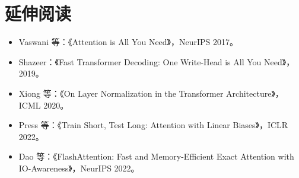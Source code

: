\documentclass[UTF8,zihao=-4]{ctexart}
\begin{document}
\section*{延伸阅读}
\begin{itemize}
  \item Vaswani 等：《Attention is All You Need》，NeurIPS 2017。
  \item Shazeer：《Fast Transformer Decoding: One Write-Head is All You Need》，2019。
  \item Xiong 等：《On Layer Normalization in the Transformer Architecture》，ICML 2020。
  \item Press 等：《Train Short, Test Long: Attention with Linear Biases》，ICLR 2022。
  \item Dao 等：《FlashAttention: Fast and Memory-Efficient Exact Attention with IO-Awareness》，NeurIPS 2022。
\end{itemize}
\end{document}

